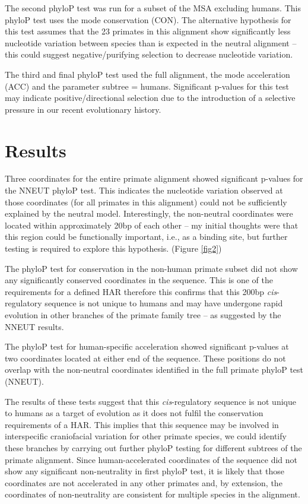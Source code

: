 \documentclass{article}[12pt]
\begin{document}
The second phyloP test was run for a subset of the MSA excluding humans. This phyloP test uses the mode conservation (CON). The alternative hypothesis for this test assumes that the 23 primates in this alignment show significantly less nucleotide variation between species than is expected in the neutral alignment – this could suggest negative/purifying selection to decrease nucleotide variation.

The third and final phyloP test used the full alignment, the mode acceleration (ACC) and the parameter subtree = humans. Significant p-values for this test may indicate positive/directional selection due to the introduction of a selective pressure in our recent evolutionary history.


\section{Results}

Three coordinates for the entire primate alignment showed significant p-values for the NNEUT phyloP test. This indicates the nucleotide variation observed at those coordinates (for all primates in this alignment) could not be sufficiently explained by the neutral model. Interestingly, the non-neutral coordinates were located within approximately 20bp of each other – my initial thoughts were that this region could be functionally important, i.e., as a binding site, but further testing is required to explore this hypothesis. (Figure \ref{fig2})

The phyloP test for conservation in the non-human primate subset did not show any significantly conserved coordinates in the sequence. This is one of the requirements for a defined \Gls{HAR} therefore this confirms that this 200bp \emph{cis}-regulatory sequence is not unique to humans and may have undergone rapid evolution in other branches of the primate family tree – as suggested by the NNEUT results.

The phyloP test for human-specific acceleration showed significant p-values at two coordinates located at either end of the sequence. These positions do not overlap with the non-neutral coordinates identified in the full primate phyloP test (NNEUT). 

The results of these tests suggest that this \emph{cis}-regulatory sequence is not unique to humans as a target of evolution as it does not fulfil the conservation requirements of a \Gls{HAR}. This implies that this sequence may be involved in interspecific craniofacial variation for other primate species, we could identify these branches by carrying out further phyloP testing for different subtrees of the primate alignment. Since human-accelerated coordinates of the sequence did not show any significant non-neutrality in first phyloP test, it is likely that those coordinates are not accelerated in any other primates and, by extension, the coordinates of non-neutrality are consistent for multiple species in the alignment.
\end{document}
